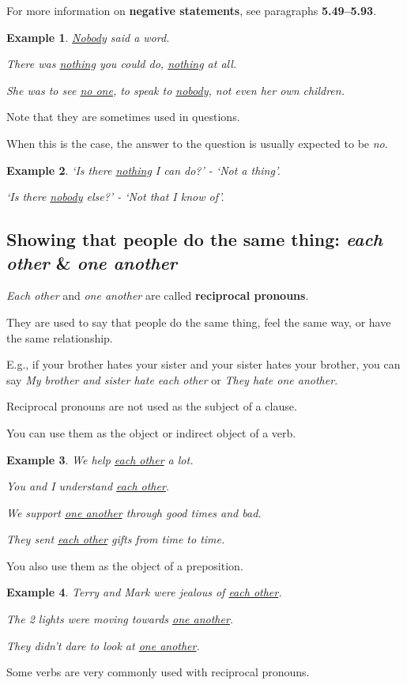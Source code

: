 \documentclass[oneside]{book}
\numberwithin{equation}{section}
\newtheorem{example}{Example}[section]
\begin{document}
For more information on \textbf{negative statements}, see paragraphs \textbf{5.49--5.93}.
\begin{example}
    \underline{Nobody} said a word.
    
    There was \underline{nothing} you could do, \underline{nothing} at all.
    
    She was to see \underline{no one}, to speak to \underline{nobody}, not even her own children.
\end{example}
Note that they are sometimes used in questions.

When this is the case, the answer to the question is usually expected to be \textit{no}.
\begin{example}
    `Is there \underline{nothing} I can do?' - `Not a thing'.
    
    `Is there \underline{nobody} else?' - `Not that I know of'.
\end{example}

\subsection{Showing that people do the same thing: \textit{each other} \& \textit{one another}}
\noindent{} \textit{Each other} and \textit{one another} are called \textbf{reciprocal pronouns}.

They are used to say that people do the same thing, feel the same way, or have the same relationship.

%
E.g., if your brother hates your sister and your sister hates your brother, you can say \textit{My brother and sister hate each other} or \textit{They hate one another}.

%
Reciprocal pronouns are not used as the subject of a clause.

You can use them as the object or indirect object of a verb.
\begin{example}
    We help \underline{each other} a lot.
    
    You and I understand \underline{each other}.
    
    We support \underline{one another} through good times and bad.
    
    They sent \underline{each other} gifts from time to time.
\end{example}
You also use them as the object of a preposition.
\begin{example}
    Terry and Mark were jealous of \underline{each other}.
    
    The 2 lights were moving towards \underline{one another}.
    
    They didn't dare to look at \underline{one another}.
\end{example}
Some verbs are very commonly used with reciprocal pronouns.
\end{document}

